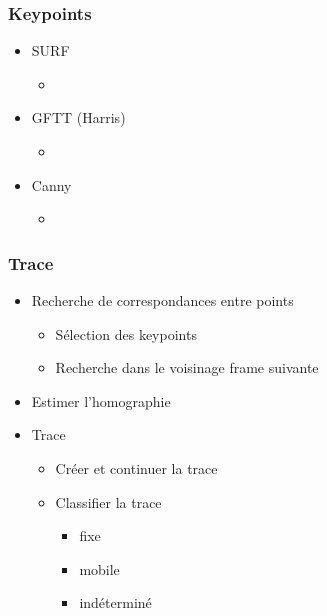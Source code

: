 \begin{frame}
  \frametitle{Keypoints}
  
  \begin{itemize}
  \item SURF
  	\begin{itemize}
  	\item
  	\end{itemize}
  	
  \item GFTT (Harris)
	\begin{itemize}
  	\item
  	\end{itemize}
  	
  \item Canny
    \begin{itemize}
  	\item
  	\end{itemize}
  	
  \end{itemize}


\end{frame}



\begin{frame}
  \frametitle{Trace}
  \begin{itemize}
  \item Recherche de correspondances entre points
  	\begin{itemize}
  	\item Sélection des keypoints
  	\item Recherche dans le voisinage frame suivante
  	\end{itemize}
  \item Estimer l'homographie
  \item Trace
  	\begin{itemize}
  	\item Créer et continuer la trace
  	\item Classifier la trace
  	\begin{itemize}
  		\item fixe
  		\item mobile
  		\item indéterminé
  	\end{itemize}
  	\end{itemize}
  \end{itemize}
  


\end{frame}


